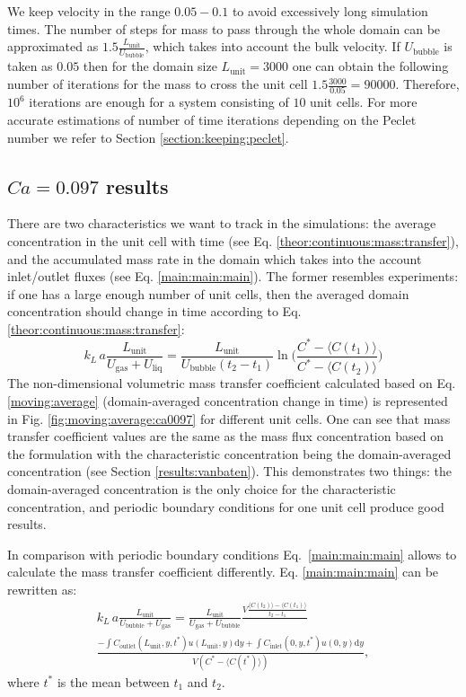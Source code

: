 \documentclass{article}
\newcommand{\beq}{\begin{equation}}
\newcommand{\feq}{\end{equation}}
\newcommand{\vol}{k_L\,a}
\newcommand{\lunit}{L_{\mathrm{unit}}}
\newcommand{\ububble}{U_{\mathrm{bubble}}}
\newcommand{\uliq}{U_{\mathrm{liq}}}
\newcommand{\ugas}{U_{\mathrm{gas}}}
\newcommand{\cinlet}{C_{\mathrm{inlet}}}
\newcommand{\coutlet}{C_{\mathrm{outlet}}}
\newcommand{\cstar}{C^{*}}
\newcommand{\volnondim}{\vol \frac{\lunit}{\ububble+\ugas}}
\begin{document}
We keep velocity in the range $0.05-0.1$ to avoid excessively long simulation times.
The number of steps for mass to pass through the whole domain can be approximated as $1.5 \frac{\lunit}{\ububble}$, which takes into account the bulk
velocity. If $\ububble$ is taken as $0.05$ then for
the domain size $\lunit=3000$ one can obtain the following number of iterations for the mass to
cross the unit cell $1.5 \frac{3000}{0.05}=90000$. Therefore, $10^{6}$ iterations are enough
for a system consisting of $10$ unit cells. For more accurate estimations of number of time
iterations depending on the Peclet number we refer to Section \ref{section:keeping:peclet}.

\subsection{$Ca=0.097$ results}
There are two characteristics we want to track in the simulations: the average
concentration in
the unit cell with time (see Eq. \ref{theor:continuous:mass:transfer}), and the accumulated mass
rate in the domain which takes into the account inlet/outlet fluxes (see Eq. \ref{main:main:main}). The former
resembles experiments: if one has a large enough number of unit cells, then the averaged domain
concentration should change in time according to Eq. \ref{theor:continuous:mass:transfer}: 
\beq
\label{moving:average}
\vol\frac{\lunit}{\ugas+\uliq}=\frac{\lunit}{\ububble (t_2
-t_1)}\ln\biggl(\frac{C^*-\langle C(t_1) \rangle}{C^*-\langle C(t_2)\rangle}\biggr)
\feq
The non-dimensional volumetric mass transfer coefficient calculated based on Eq.
\ref{moving:average} (domain-averaged concentration change in time) is
represented in Fig. \ref{fig:moving:average:ca0097} for different unit cells. One can see that mass transfer coefficient values are the same as the mass flux
concentration based on the \citeauthor{vanbaten-circular} formulation with the characteristic
concentration being the domain-averaged concentration (see Section
\ref{results:vanbaten}). This demonstrates two things:  the domain-averaged
concentration is the only choice for the characteristic concentration, and
periodic boundary conditions for one unit cell produce good results.

In comparison with periodic boundary conditions Eq.~\ref{main:main:main} allows
to calculate the mass transfer coefficient differently. Eq.
\ref{main:main:main}  can be rewritten as: \beq
\label{main:main:main:thorough}
\begin{aligned}
\volnondim=\frac{\lunit}{\ugas+\ububble} \frac{V \frac{\langle C(t_2)\rangle - \langle C(t_1)
\rangle}{t_2-t_1}}{}\\
\frac{-\int{\coutlet(\lunit,y,t^*) u(\lunit,y) \mathrm{d} y}+\int{\cinlet(0,y,t^*)
u(0,y)\mathrm{d} y}}{V (\cstar - \langle C(t^*) \rangle)},
\end{aligned}
\feq
where $t^*$ is the mean between $t_1$ and $t_2$.
\end{document}
